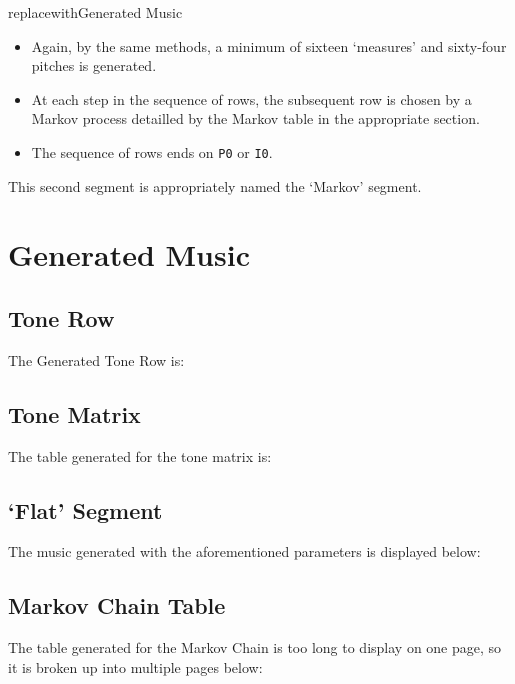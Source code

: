 \documentclass[10pt,letterpaper]{article}
\newcommand{\code}[1]{\colorbox{light-gray}{\texttt{#1}}}
\begin{document}
replacewith{Generated Music}
\begin{itemize}
  \item{Again, by the same methods, a minimum of sixteen `measures' and
    sixty-four pitches is generated. }
  \item{At each step in the sequence of rows, the subsequent row is chosen by a Markov
    process detailled by the Markov table in the appropriate section.}
  \item{The sequence of rows ends on \code{P0} or \code{I0}. }
\end{itemize}

This second segment is appropriately named the `Markov' segment.

\clearpage{}

\section*{Generated Music}

\subsection*{Tone Row}

The Generated Tone Row is:


\subsection*{Tone Matrix}

The table generated for the tone matrix is:



\clearpage{}

\subsection*{`Flat' Segment}
The music generated with the aforementioned parameters is displayed below:




\subsection*{Markov Chain Table}
The table generated for the Markov Chain is too long to display on one page,
so it is broken up into multiple pages below:
\end{document}
